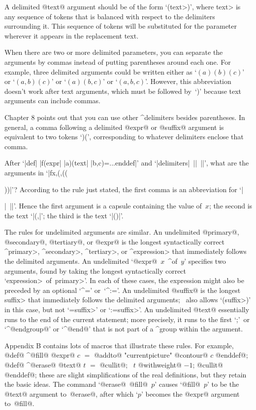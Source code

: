 {{{{\smallskip
\item\bull A delimited @text@ argument should be of the form
`(\<text>)', where \<text> is any sequence of tokens that is balanced
with respect to the delimiters surrounding it. This sequence of tokens
will be substituted for the parameter wherever it appears in the
replacement text.

\smallskip
\item\bull When there are two or more delimited parameters, you can
separate the arguments by commas instead of putting parentheses around
each one. For example, three delimited arguments could be written
either as `$(a)(b)(c)$' or `$(a,b)(c)$' or `$(a)(b,c)$' or `$(a,b,c)$'.
However, this abbreviation doesn't work after text arguments, which
must be followed by~`)' because text arguments can include commas.

\ddanger Chapter 8 points out that you can use other ^{delimiters}
besides parentheses. In general, a comma following a delimited
@expr@ or @suffix@ argument is equivalent to two tokens `)\thinspace(',
corresponding to whatever delimiters enclose that comma.

\ddangerexercise After `|def| |f(expr| |a)(text| |b,c)=...enddef|'
and `|delimiters|~|{{|~|}}|', what are the arguments in
`|f{{x,(,}}((}}))|'?
\answer According to the rule just stated, the first comma is an
abbreviation for `|}}|~|{{|'. Hence the first argument is a capsule
containing the value of~$x$; the second is the text `|(,|'\thinspace;
the third is the text `|(}})|'.

\danger The rules for undelimited arguments are similar. An
undelimited @primary@, @secondary@, @tertiary@, or @expr@ is the
longest syntactically correct ^\<primary>, ^\<secondary>, ^\<tertiary>,
or ^\<expression> that immediately follows the delimited arguments.
An undelimited `@expr@~$x$~^{of}~$y$' specifies two arguments, found
by taking the longest syntactically correct `\<expression>~of~\<primary>'.
In each of these cases, the expression might also be preceded by an
optional `^{=}' or~`^{:=}'.  An undelimited @suffix@ is the longest
\<suffix> that immediately follows the delimited arguments; \MF\ also
allows `(\<suffix>)' in this case, but not `=\<suffix>' or `:=\<suffix>'.
An undelimited @text@ essentially runs to the end of the current
statement; more precisely, it runs to the first `;'\ or `^@endgroup@' or
`^@end@' that is not part of a ^{group} within the argument.

\danger Appendix B contains lots of macros that illustrate these
rules. For example,
\begindisplay
@def@ ^@fill@ @expr@ $c$ $=$ @addto@ "currentpicture" @contour@ $c$ @enddef@;\cr
@def@ ^@erase@ @text@ $t$ $=$ @cullit@; \ $t$ @withweight@ $-1$;
 @cullit@ @enddef@;\cr
\enddisplay
these are slight simplifications of the real definitions, but they retain the
basic ideas. The command `@erase@~@fill@~$p$' causes `@fill@~$p$' to be
the @text@ argument to~@erase@, after which `$p$' becomes the @expr@
argument to~@fill@.

